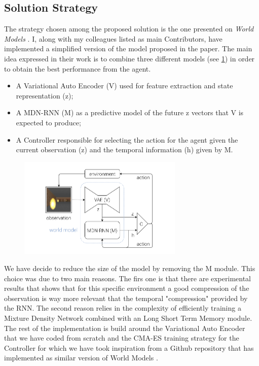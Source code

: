 \documentclass[10pt,a4paper]{article}
\begin{document}
\subsection{Solution Strategy}
The strategy chosen among the proposed solution is the one presented on \textit{World Models} \cite{DBLP:journals/corr/abs-1803-10122}. I, along with my colleagues listed as main Contributors, have implemented a simplified version of the model proposed in the paper. The main idea expressed in their work is to combine three different models (see \ref{fig:wm}) in order to obtain the best performance from the agent. 
\begin{itemize}
    \item A Variational Auto Encoder (V) used for feature extraction and state representation (z);
    \item A MDN-RNN (M) as a predictive model of the future z vectors that V is expected to produce;
    \item A Controller responsible for selecting the action for the agent given the current observation (z) and the temporal information (h) given by M.
\end{itemize}
\begin{figure}[h]
    \centering
    \includegraphics[width=0.7\textwidth]{images/wm.png} 
    \caption{}
    \label{fig:wm}
\end{figure}


\noindent We have decide to reduce the size of the model by removing the M module. This choice was due to two main reasons. The firs one is that there are experimental results that shows that for this specific environment a good compression of the observation is way more relevant that the temporal "compression" provided by the RNN. The second reason relies in the complexity of efficiently training a Mixture Density Network combined with an Long Short Term Memory module. 
The rest of the implementation is build around the Variational Auto Encoder that we have coded from scratch and the CMA-ES training strategy for the Controller for which we have took inspiration from a Github repository that has implemented as similar version of World Models \cite{ctallec-wm}.  
\end{document}
